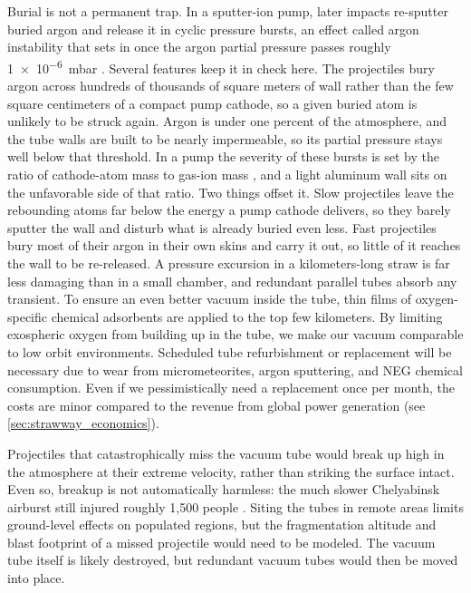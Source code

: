 \documentclass{article}
\begin{document}
Burial is not a permanent trap.  In a sputter-ion pump, later impacts re-sputter buried argon and release it in cyclic pressure bursts, an effect called argon instability that sets in once the argon partial pressure passes roughly \SI{1e-6}{\milli\bar} \cite{schulz1999sputterion}.  Several features keep it in check here.  The projectiles bury argon across hundreds of thousands of square meters of wall rather than the few square centimeters of a compact pump cathode, so a given buried atom is unlikely to be struck again.  Argon is under one percent of the atmosphere, and the tube walls are built to be nearly impermeable, so its partial pressure stays well below that threshold.  In a pump the severity of these bursts is set by the ratio of cathode-atom mass to gas-ion mass \cite{vaumoron1970argon}, and a light aluminum wall sits on the unfavorable side of that ratio.  Two things offset it.  Slow projectiles leave the rebounding atoms far below the energy a pump cathode delivers, so they barely sputter the wall and disturb what is already buried even less.  Fast projectiles bury most of their argon in their own skins and carry it out, so little of it reaches the wall to be re-released.  A pressure excursion in a kilometers-long straw is far less damaging than in a small chamber, and redundant parallel tubes absorb any transient. To ensure an even better vacuum inside the tube, thin films of oxygen-specific chemical adsorbents  are applied to the top few kilometers. By limiting exospheric oxygen from building up in the tube, we make our vacuum comparable to low orbit environments.  Scheduled tube refurbishment or replacement will be necessary due to wear from micrometeorites, argon sputtering, and NEG chemical consumption. Even if we pessimistically need a replacement once per month, the costs are minor compared to the revenue from global power generation (see \autoref{sec:strawway_economics}).

Projectiles that catastrophically miss the vacuum tube would break up high in the atmosphere at their extreme velocity, rather than striking the surface intact. Even so, breakup is not automatically harmless: the much slower Chelyabinsk airburst still injured roughly 1,500 people \cite{popova2021chelyabinsk}. Siting the tubes in remote areas limits ground-level effects on populated regions, but the fragmentation altitude and blast footprint of a missed projectile would need to be modeled.   The vacuum tube itself is likely destroyed, but redundant vacuum tubes would then be moved into place.
\end{document}
